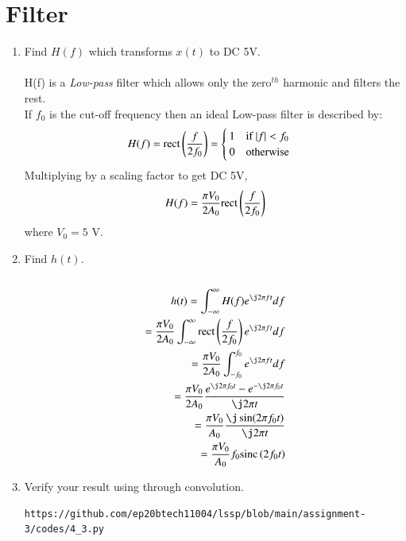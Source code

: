 \documentclass[journal,12pt,twocolumn]{IEEEtran}
\renewcommand\thesection{\arabic{section}}
\begin{document}
	\section{Filter}
	\begin{enumerate}[label=\thesection.\arabic*
		,ref=\thesection.\theenumi]
		\item Find $H(f)$ which transforms $x(t)$ to DC 5V.\\
		\solution\\
		H(f) is a \textit{Low-pass} filter which allows only the zero$^{th}$ harmonic and filters the rest.\\
		
		If $f_0$ is the cut-off frequency then an ideal Low-pass filter is described by:
		\begin{equation}
			H(f) = \rect{\frac{f}{2f_0}} = \begin{cases}
				1 \quad $if $ \abs{f} < f_0\\
				0 \quad $otherwise$
			\end{cases}
		\end{equation}
		Multiplying by a scaling factor to get DC 5V,
		\begin{equation}
			H(f) = \frac{\pi V_0}{2A_0}\text{rect}\left(\frac{f}{2f_0}\right)
			\label{eq:Hf}
		\end{equation}
		where $V_0 = 5$ V.
		\item Find $h(t)$.\\
		\solution\\
		\begin{align}
			h(t) = \int_{-\infty}^{\infty} H(f)e^{\j2\pi f t}df\\
			= \frac{\pi V_0}{2A_0} \int_{-\infty}^{\infty}\rect{\frac{f}{2f_0}} e^{\j2\pi f t}df\\
			= \frac{\pi V_0}{2A_0} \int_{-f_0}^{f_0} e^{\j2\pi f t}df\\
			= \frac{\pi V_0}{2A_0} \dfrac{e^{\j2\pi f_0 t} - e^{-\j2\pi f_0 t}}{\j2\pi t}\\
			= \frac{\pi V_0}{A_0} \dfrac{\j\sin(2\pi f_0 t)}{\j2\pi t}\\
			= \frac{\pi V_0}{A_0} f_0\sinc{2f_0 t}
		\end{align}
		\item Verify your result using  through convolution.
		\solution
		\begin{lstlisting}
https://github.com/ep20btech11004/lssp/blob/main/assignment-3/codes/4_3.py
		\end{lstlisting}
		\begin{figure}[!ht]
			\begin{center}

\end{center}
\end{figure}
\end{enumerate}
\end{document}
